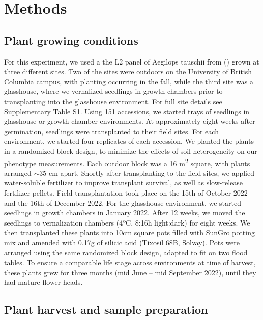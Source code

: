 \documentclass[12pt, letterpaper, ]{report}
\begin{document}
\section{Methods}

\subsection{Plant growing conditions}

For this experiment, we used a the L2 panel of Aegilops tauschii from (\cite{gaurav_population_2021}) grown at three different sites. Two of the sites were outdoors on the University of British Columbia campus, with planting occurring in the fall, while the third site was a glasshouse, where we vernalized seedlings in growth chambers prior to transplanting into the glasshouse environment. For full site details see Supplementary Table S1. Using 151 accessions, we started trays of seedlings in glasshouse or growth chamber environments. At approximately eight weeks after germination, seedlings were transplanted to their field sites. For each environment, we started four replicates of each accession. We planted the plants in a randomized block design, to minimize the effects of soil heterogeneity on our phenotype measurements. Each outdoor block was a 16 m\textsuperscript{2} square, with plants arranged $\sim$35 cm apart. Shortly after transplanting to the field sites, we applied water-soluble fertilizer to improve transplant survival, as well as slow-release fertilizer pellets. Field transplantation took place on the 15th of October 2022 and the 16th of December 2022. For the glasshouse environment, we started seedlings in growth chambers in January 2022. After 12 weeks, we moved the seedlings to vernalization chambers (4ºC, 8:16h light:dark) for eight weeks. We then transplanted these plants into 10cm square pots filled with SunGro potting mix and amended with 0.17g of silicic acid (Tixosil 68B, Solvay). Pots were arranged using the same randomized block design, adapted to fit on two flood tables. To ensure a comparable life stage across environments at time of harvest, these plants grew for three months (mid June – mid September 2022), until they had mature flower heads. 

\subsection{Plant harvest and sample preparation}
\end{document}
